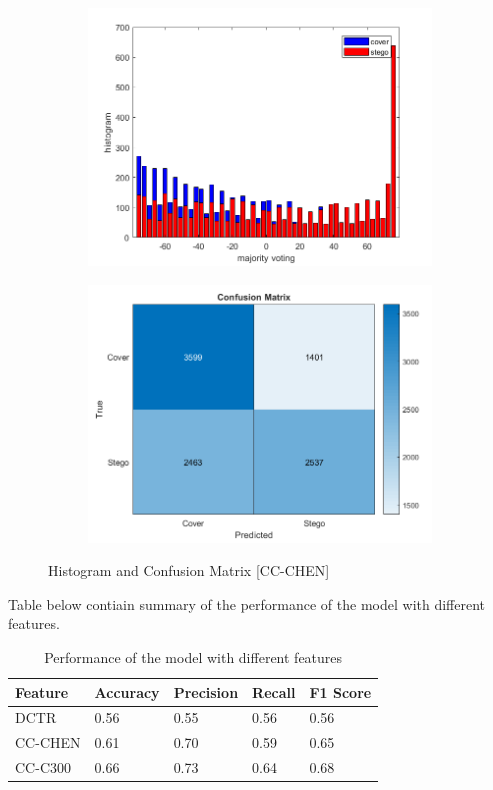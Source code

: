 \begin{figure}[H]
    \begin{subfigure}[b]{0.5\textwidth}
        \includegraphics[width=\textwidth]{img/histochen.png}
    \end{subfigure}
    \hfill
    \begin{subfigure}[b]{0.5\textwidth}
        \includegraphics[width=\textwidth]{img/confusionChen.png}
    \end{subfigure}
    \caption{Histogram and Confusion Matrix [CC-CHEN]}
\end{figure}
\begin{flushleft}
Table below contiain summary of the performance of the model with different features.
\end{flushleft}
\begin{table}[H]
    \centering
    \begin{tabular}{|l|l|l|l|l|}
    \hline
    Feature & Accuracy & Precision & Recall & F1 Score \\ \hline
    DCTR    & 0.56   & 0.55    & 0.56 & 0.56  \\ \hline
    CC-CHEN & 0.61     & 0.70      & 0.59   & 0.65     \\ \hline
    CC-C300 & 0.66     & 0.73      & 0.64   & 0.68     \\ \hline
    \end{tabular}
    \caption{Performance of the model with different features}
\end{table}
\clearpage

